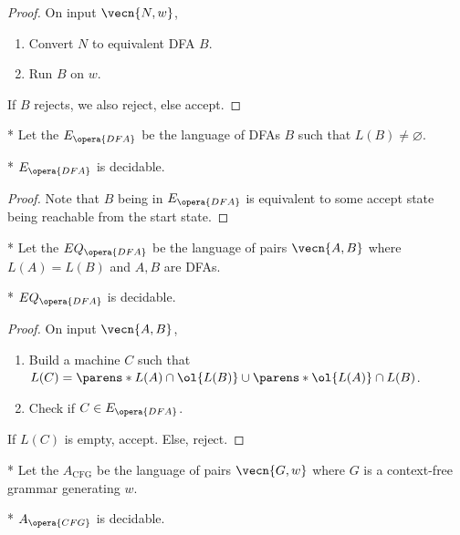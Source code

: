 \begin{proof}
	On input $\vecn{N,w}$,
	\begin{enumerate}
		\item Convert $N$ to equivalent DFA $B$.
		\item Run $B$ on $w$.
	\end{enumerate}
	If $B$ rejects, we also reject, else accept.
\end{proof}

\begin{defn}*
	Let the  $E_{\opera{DFA}}$ be the language of DFAs $B$ such that $L(B) \neq \varnothing$.
\end{defn}

\begin{fact}*
	$E_{\opera{DFA}}$ is decidable.
\end{fact}

\begin{proof}
	Note that $B$ being in $E_{\opera{DFA}}$ is equivalent to some accept state being reachable from the start state.
\end{proof}

\begin{defn}*
	Let the  $EQ_{\opera{DFA}}$ be the language of pairs $\vecn{A,B}$ where $L(A) = L(B)$ and $A,B$ are DFAs.
\end{defn}

\begin{fact}*
	$EQ_{\opera{DFA}}$ is decidable.
\end{fact}

\begin{proof}
	On input $\vecn{A,B}$, 
	\begin{enumerate}
		\item Build a machine $C$ such that $L(C) = \parens*{L(A)\cap \ol{L(B)}} \cup  \parens*{\ol{L(A)} \cap L(B)}$. 
		\item Check if $C\in E_{\opera{DFA}}$.
	\end{enumerate}
	If $L(C)$ is empty, accept. Else, reject.
\end{proof}

\begin{defn}*	
	Let the  $A_{\operatorname{CFG}}$ be the language of pairs $\vecn{G,w}$ where $G$ is a context-free grammar generating $w$.
\end{defn}

\begin{fact}*
	$A_{\opera{CFG}}$ is decidable.
\end{fact}

